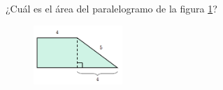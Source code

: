 ¿Cuál es el \'area del paralelogramo de la figura \ref{fig:area_compuesta_02}?
\begin{figure}[H]
    \begin{center}
        \includegraphics[width=0.3\textwidth]{../images/area_compuesta_02.png}
    \end{center}
    \caption{}
    \label{fig:area_compuesta_02}
\end{figure}